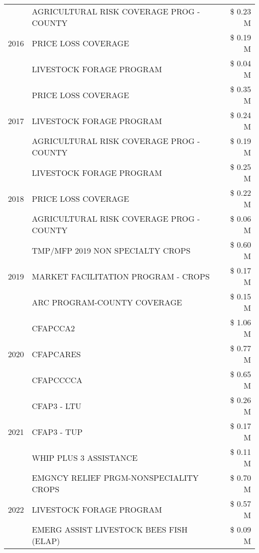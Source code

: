 \begin{tabular}{llr}
\cline{1-3}
\multirow[t]{3}{*}{2016} & AGRICULTURAL RISK COVERAGE PROG - COUNTY & \$ 0.23 M \\
 & PRICE LOSS COVERAGE & \$ 0.19 M \\
 & LIVESTOCK FORAGE PROGRAM & \$ 0.04 M \\
\cline{1-3}
\multirow[t]{3}{*}{2017} & PRICE LOSS COVERAGE & \$ 0.35 M \\
 & LIVESTOCK FORAGE PROGRAM & \$ 0.24 M \\
 & AGRICULTURAL RISK COVERAGE PROG - COUNTY & \$ 0.19 M \\
\cline{1-3}
\multirow[t]{3}{*}{2018} & LIVESTOCK FORAGE PROGRAM & \$ 0.25 M \\
 & PRICE LOSS COVERAGE & \$ 0.22 M \\
 & AGRICULTURAL RISK COVERAGE PROG - COUNTY & \$ 0.06 M \\
\cline{1-3}
\multirow[t]{3}{*}{2019} & TMP/MFP 2019 NON SPECIALTY CROPS & \$ 0.60 M \\
 & MARKET FACILITATION PROGRAM - CROPS & \$ 0.17 M \\
 & ARC PROGRAM-COUNTY COVERAGE & \$ 0.15 M \\
\cline{1-3}
\multirow[t]{3}{*}{2020} & CFAPCCA2 & \$ 1.06 M \\
 & CFAPCARES & \$ 0.77 M \\
 & CFAPCCCCA & \$ 0.65 M \\
\cline{1-3}
\multirow[t]{3}{*}{2021} & CFAP3 - LTU & \$ 0.26 M \\
 & CFAP3 - TUP & \$ 0.17 M \\
 & WHIP PLUS 3 ASSISTANCE & \$ 0.11 M \\
\cline{1-3}
\multirow[t]{3}{*}{2022} & EMGNCY RELIEF PRGM-NONSPECIALITY CROPS & \$ 0.70 M \\
 & LIVESTOCK FORAGE PROGRAM & \$ 0.57 M \\
 & EMERG ASSIST LIVESTOCK BEES FISH (ELAP) & \$ 0.09 M \\
\cline{1-3}
\bottomrule
\end{tabular}
